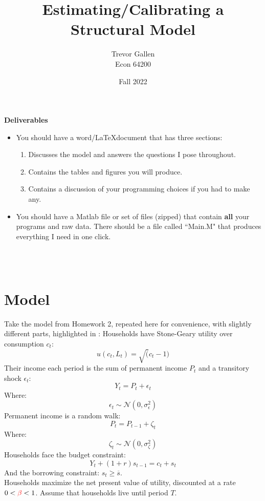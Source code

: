 \documentclass[11pt]{article}
\title{Estimating/Calibrating a Structural Model}
\author{ Trevor Gallen \\ Econ 64200 }
\date{Fall 2022}
\begin{document}


\maketitle


\textbf{Deliverables}
\begin{itemize}
\item You should have a word/\LaTeX document that has three sections: 
\begin{enumerate}
\item Discusses the model and answers the questions I pose throughout.
\item Contains the tables and figures you will produce.
\item Contains a discussion of your programming choices if you had to make any.
\end{enumerate}
\item You should have a Matlab file or set of files (zipped) that contain \textbf{all} your programs and raw data.  There should be a file called ``Main.M" that produces everything I need in one click.
\end{itemize}
\ \\
\ \\


\section{Model}
Take the model from Homework 2, repeated here for convenience, with slightly different  parts, highlighted in {\color{red}{red}}:
Households have Stone-Geary utility over consumption $c_t$:
$$u(c_t,L_t)=\sqrt(c_t-1)$$
Their income each period is the sum of permanent income $P_t$ and a transitory shock $\epsilon_t$:
$$ Y_t=P_t+\epsilon_t$$
Where:
$$\epsilon_t\sim\mathcal{N}(0,\sigma^2_\epsilon)$$
Permanent income is a random walk:
$$P_t=P_{t-1}+\zeta_t$$
Where:
$$\zeta_t\sim\mathcal{N}(0,\sigma^2_\zeta)$$
Households face the budget constraint:
$$Y_t+(1+r)s_{t-1}=c_t+s_t$$
And the borrowing constraint:  $s_t\geq \overline{s}$.\\

Households maximize the net present value of utility, discounted at a rate $0<{\color{red}{\beta}}<1$. Assume that households live until period $T$.\\
\end{document}
